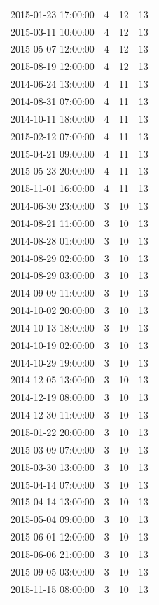 \begin{tabular}{lrrr}
2015-01-23 17:00:00 & 4 & 12 & 13 \\
2015-03-11 10:00:00 & 4 & 12 & 13 \\
2015-05-07 12:00:00 & 4 & 12 & 13 \\
2015-08-19 12:00:00 & 4 & 12 & 13 \\
2014-06-24 13:00:00 & 4 & 11 & 13 \\
2014-08-31 07:00:00 & 4 & 11 & 13 \\
2014-10-11 18:00:00 & 4 & 11 & 13 \\
2015-02-12 07:00:00 & 4 & 11 & 13 \\
2015-04-21 09:00:00 & 4 & 11 & 13 \\
2015-05-23 20:00:00 & 4 & 11 & 13 \\
2015-11-01 16:00:00 & 4 & 11 & 13 \\
2014-06-30 23:00:00 & 3 & 10 & 13 \\
2014-08-21 11:00:00 & 3 & 10 & 13 \\
2014-08-28 01:00:00 & 3 & 10 & 13 \\
2014-08-29 02:00:00 & 3 & 10 & 13 \\
2014-08-29 03:00:00 & 3 & 10 & 13 \\
2014-09-09 11:00:00 & 3 & 10 & 13 \\
2014-10-02 20:00:00 & 3 & 10 & 13 \\
2014-10-13 18:00:00 & 3 & 10 & 13 \\
2014-10-19 02:00:00 & 3 & 10 & 13 \\
2014-10-29 19:00:00 & 3 & 10 & 13 \\
2014-12-05 13:00:00 & 3 & 10 & 13 \\
2014-12-19 08:00:00 & 3 & 10 & 13 \\
2014-12-30 11:00:00 & 3 & 10 & 13 \\
2015-01-22 20:00:00 & 3 & 10 & 13 \\
2015-03-09 07:00:00 & 3 & 10 & 13 \\
2015-03-30 13:00:00 & 3 & 10 & 13 \\
2015-04-14 07:00:00 & 3 & 10 & 13 \\
2015-04-14 13:00:00 & 3 & 10 & 13 \\
2015-05-04 09:00:00 & 3 & 10 & 13 \\
2015-06-01 12:00:00 & 3 & 10 & 13 \\
2015-06-06 21:00:00 & 3 & 10 & 13 \\
2015-09-05 03:00:00 & 3 & 10 & 13 \\
2015-11-15 08:00:00 & 3 & 10 & 13 \\

\end{tabular}
